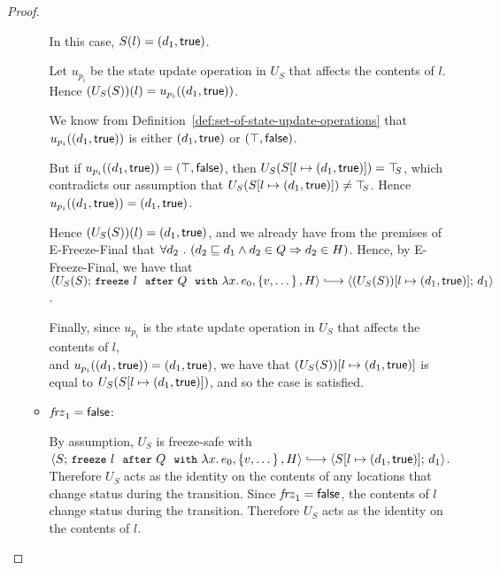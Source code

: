 \begin{proof}
\begin{itemize}
\begin{itemize}
          In this case, $S(l) = (d_1, \textsf{true})$.

          Let $u_{p_i}$ be the state update operation in $U_S$ that
          affects the contents of $l$.  Hence $(U_S(S))(l) =
          u_{p_i}((d_1, \textsf{true}))$.

          We know from
          Definition~\ref{def:set-of-state-update-operations} that
          $u_{p_i}((d_1, \textsf{true}))$ is either
          $(d_1, \textsf{true})$ or $(\top, \textsf{false})$.

          But if $u_{p_i}((d_1, \textsf{true})) =
          (\top, \textsf{false})$, then
          $U_S(S[l \mapsto (d_1, \textsf{true})]) = \top\hspace{-0.85mm}_{S}$, which
          contradicts our assumption that
          $U_S(S[l \mapsto (d_1, \textsf{true})]) \neq \top\hspace{-0.85mm}_{S}$.  Hence
          $u_{p_i}((d_1, \textsf{true})) =
          (d_1, \textsf{true})$.

          Hence $(U_S(S))(l) = (d_1, \textsf{true})$, and we
          already have from the premises of {\sc E-Freeze-Final} that
          $\forall{d_2} ~.~ ( {d_2 \sqsubseteq d_1 \land d_2 \in Q}
          \Rightarrow d_2 \in H)$.  Hence, by {\sc E-Freeze-Final}, we
          have that \\
          $\config{U_S(S)}{\freezeafterfull{l}{Q}{\lam{x}{e_0}}{\setof{v,
                \dots}}{H}} \parstepsto \\
          \config{\extS{(U_S(S))}{l}{d_1}{\frozentrue}}{d_1}$.

          Finally, since $u_{p_i}$ is the state update operation in
          $U_S$ that affects the contents of $l$, \\ and
          $u_{p_i}((d_1, \textsf{true})) =
          (d_1, \textsf{true})$, we have that
          $(U_S(S))[l \mapsto (d_1, \textsf{true})]$ is equal to
          $U_S(S[l \mapsto (d_1, \textsf{true})])$, and so the case is
          satisfied.

        \item $\mathit{frz}_1 = \textsf{false}$:

          By assumption, $U_S$ is freeze-safe with
          $\config{S}{\freezeafterfull{l}{Q}{\lam{x}{e_0}}{\setof{v,
                \dots}}{H}} \parstepsto
          \config{\extS{S}{l}{d_1}{\frozentrue}}{d_1}$.  Therefore
          $U_S$ acts as the identity on the contents of any locations
          that change status during the transition.  Since $\mathit{frz}_1
          = \textsf{false}$, the contents of $l$ change status during
          the transition.  Therefore $U_S$ acts as the identity on the
          contents of $l$.


\end{itemize}
\end{itemize}
\end{proof}
